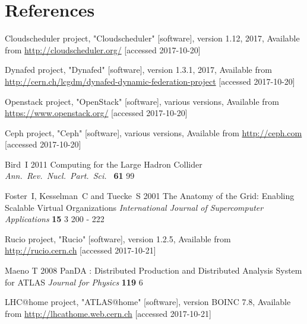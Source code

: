 \documentclass[a4paper]{jpconf}
\begin{document}
\section*{References}
\begin{thebibliography}{9}
  Cloudscheduler project, "Cloudscheduler" [software], version 1.12, 2017, Available from \url{http://cloudscheduler.org/} [accessed 2017-10-20]

  Dynafed project, "Dynafed" [software], version 1.3.1, 2017, Available from \url{http://cern.ch/lcgdm/dynafed-dynamic-federation-project}  [accessed 2017-10-20]

  Openstack project, "OpenStack" [software], various versions, Available from \url{https://www.openstack.org/} [accessed 2017-10-20]

  Ceph project, "Ceph" [software], various versions, Available from \url{http://ceph.com} [accessed 2017-10-20]


  Bird~I
  2011
  Computing for the Large Hadron Collider
  {\it Ann.\ Rev.\ Nucl.\ Part.\ Sci.\ } {\bf 61} 99

  Foster~I, Kesselman~C and Tuecke~S
  2001
  The Anatomy of the Grid: Enabling Scalable Virtual Organizations
  {\it International Journal of Supercomputer Applications} {\bf 15} 3 200 - 222

  Rucio project, "Rucio" [software], version 1.2.5, Available from \url{http://rucio.cern.ch} [accessed 2017-10-21]

%
%
%

  Maeno T
  2008
  PanDA : Distributed Production and Distributed Analysis System for ATLAS
  {\it Journal for Physics} {\bf 119} 6

  LHC@home project, "ATLAS@home" [software], version BOINC 7.8, Available from \url{http://lhcathome.web.cern.ch} [accessed 2017-10-21]

\end{thebibliography}
\end{document}

